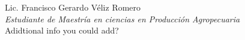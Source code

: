 \newpage

{\hoffset=0pt

}

{\hoffset=0pt

}


\bookbodygeometry

\pagestyle{preindex}
\setcounter{page}{5}



\blindtext

\raggedleft
Lic. Francisco Gerardo Véliz Romero\\[1mm]
\textit{Estudiante de Maestría en ciencias en Producción Agropecuaria}\\[1.5mm]
\small{Adidtional info you could add?}

\raggedright



